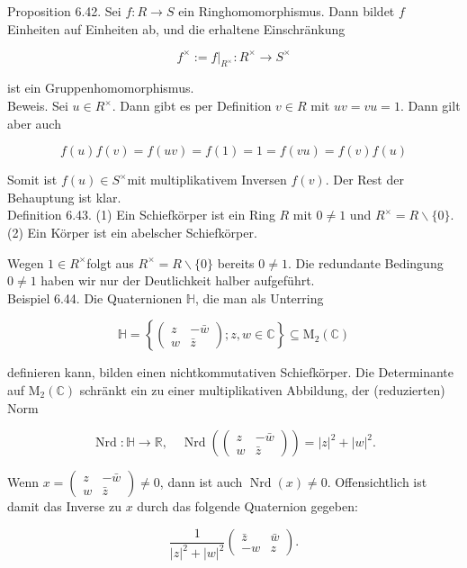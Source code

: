 \documentclass[10pt, letterpaper]{article}
\begin{document}
Proposition 6.42. Sei $f: R \rightarrow S$ ein Ringhomomorphismus. Dann bildet $f$ Einheiten auf Einheiten ab, und die erhaltene Einschränkung

$$
f^{\times}:=\left.f\right|_{R^{\times}}: R^{\times} \rightarrow S^{\times}
$$

ist ein Gruppenhomomorphismus.\\
Beweis. Sei $u \in R^{\times}$. Dann gibt es per Definition $v \in R$ mit $u v=v u=1$. Dann gilt aber auch

$$
f(u) f(v)=f(u v)=f(1)=1=f(v u)=f(v) f(u)
$$

Somit ist $f(u) \in S^{\times}$mit multiplikativem Inversen $f(v)$. Der Rest der Behauptung ist klar.\\
Definition 6.43. (1) Ein Schiefkörper ist ein Ring $R$ mit $0 \neq 1$ und $R^{\times}=R \backslash\{0\}$.\\
(2) Ein Körper ist ein abelscher Schiefkörper.

Wegen $1 \in R^{\times}$folgt aus $R^{\times}=R \backslash\{0\}$ bereits $0 \neq 1$. Die redundante Bedingung $0 \neq 1$ haben wir nur der Deutlichkeit halber aufgeführt.\\
Beispiel 6.44. Die Quaternionen $\mathbb{H}$, die man als Unterring

$$
\mathbb{H}=\left\{\left(\begin{array}{cc}
z & -\bar{w} \\
w & \bar{z}
\end{array}\right) ; z, w \in \mathbb{C}\right\} \subseteq \mathrm{M}_{2}(\mathbb{C})
$$

definieren kann, bilden einen nichtkommutativen Schiefkörper. Die Determinante auf $\mathrm{M}_{2}(\mathbb{C})$ schränkt ein zu einer multiplikativen Abbildung, der (reduzierten) Norm

$$
\operatorname{Nrd}: \mathbb{H} \rightarrow \mathbb{R}, \quad \operatorname{Nrd}\left(\left(\begin{array}{cc}
z & -\bar{w} \\
w & \bar{z}
\end{array}\right)\right)=|z|^{2}+|w|^{2} .
$$

Wenn $x=\left(\begin{array}{cc}z & -\bar{w} \\ w & \bar{z}\end{array}\right) \neq 0$, dann ist auch $\operatorname{Nrd}(x) \neq 0$. Offensichtlich ist damit das Inverse zu $x$ durch das folgende Quaternion gegeben:

$$
\frac{1}{|z|^{2}+|w|^{2}}\left(\begin{array}{cc}
\bar{z} & \bar{w} \\
-w & z
\end{array}\right) .
$$
\end{document}

